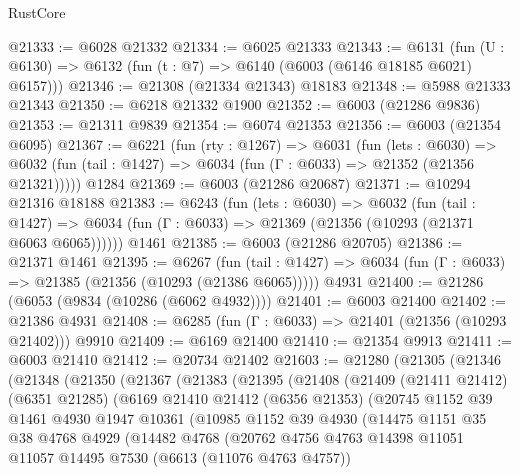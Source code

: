\begin{lexlean}{RustCore}
\begin{coremodule}
@21333 := @6028 @21332
@21334 := @6025 @21333
@21343 := @6131
    (fun (U : @6130) => @6132 (fun (t : @7) => @6140 (@6003 (@6146 @18185 @6021) @6157)))
@21346 := @21308 (@21334 @21343) @18183
@21348 := @5988 @21333 @21343
@21350 := @6218 @21332 @1900
@21352 := @6003 (@21286 @9836)
@21353 := @21311 @9839
@21354 := @6074 @21353
@21356 := @6003 (@21354 @6095)
@21367 := @6221
    (fun (rty : @1267) =>
    @6031
      (fun (lets : @6030) =>
      @6032 (fun (tail : @1427) => @6034 (fun (Γ : @6033) => @21352 (@21356 @21321)))))
    @1284
@21369 := @6003 (@21286 @20687)
@21371 := @10294 @21316 @18188
@21383 := @6243
    (fun (lets : @6030) =>
    @6032
      (fun (tail : @1427) =>
      @6034 (fun (Γ : @6033) => @21369 (@21356 (@10293 (@21371 @6063 @6065))))))
    @1461
@21385 := @6003 (@21286 @20705)
@21386 := @21371 @1461
@21395 := @6267
    (fun (tail : @1427) => @6034 (fun (Γ : @6033) => @21385 (@21356 (@10293 (@21386 @6065)))))
    @4931
@21400 := @21286 (@6053 (@9834 (@10286 (@6062 @4932))))
@21401 := @6003 @21400
@21402 := @21386 @4931
@21408 := @6285 (fun (Γ : @6033) => @21401 (@21356 (@10293 @21402))) @9910
@21409 := @6169 @21400
@21410 := @21354 @9913
@21411 := @6003 @21410
@21412 := @20734 @21402
@21603 := @21280
    (@21305
      (@21346
        (@21348
          (@21350
            (@21367
              (@21383
                (@21395
                  (@21408
                    (@21409
                      (@21411 @21412)
                      (@6351 @21285)
                      (@6169
                        @21410
                        @21412
                        (@6356 @21353)
                        (@20745
                          @1152
                          @39
                          @1461
                          @4930
                          @1947
                          @10361
                          (@10985
                            @1152
                            @39
                            @4930
                            (@14475
                              @1151
                              @35
                              @38
                              @4768
                              @4929
                              (@14482
                                @4768
                                (@20762
                                  @4756
                                  @4763
                                  @14398
                                  @11051
                                  @11057
                                  @14495
                                  @7530
                                  (@6613 (@11076 @4763 @4757))

\end{coremodule}
\end{lexlean}
